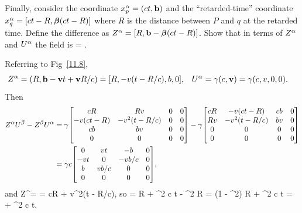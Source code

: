 \newcommand{\Za}{Z^\alp}
\newcommand{\Zsa}{Z_\alp}
\newcommand{\Zb}{Z^\bet}
\newcommand{\vbet}{\boldsymbol{\beta}}

\begin{problem}
	Finally, consider the coordinate $x^\alpha_p = (ct, \vb{b})$ and the ``retarded-time'' coordinate $\xaq = [ct - R, \vbet(ct - R)]$ where $R$ is the distance between $P$ and $q$ at the retarded time.  Define the difference as $\Za = [R, \vbb - \vbet(ct - R)]$.  Show that in terms of $\Za$ and $U^\alpha$ the field is
	\beqn \label{show2.c}
		\Fab =  \frac{\Za \Ub - \Zb \Ua}{(\Usa \Za / c)^3}.
	\eeqn
	\vfix
\end{problem}

\begin{solution}
	Referring to Fig~\ref{11.8},
	\begin{align*}
		\Za &= (R, \vbb - \vv t + \vv R / c) = [R, -v (t - R / c), b, 0], &
		\Ua &= \gam (c, \vv) = \gam (c, v, 0, 0).
	\end{align*}
	Then
	\begin{align*}
		\Za\Ub - \Zb \Ua &= \gam
			\mqty[c R & R v & 0 & 0 \\
				-v (c t - R) & -v^2 (t - R / c) & 0 & 0 \\
				c b & b v & 0 & 0 \\
				0 & 0 & 0 & 0 ]
			- \gam
			\mqty[ c R & -v (c t - R) & c b & 0 \\
				R v & -v^2 (t - R / c) & b v & 0 \\
				0 & 0 & 0 & 0 \\
				0 & 0 & 0 & 0 ] \\
		&= \gam c
			\mqty[0 & v t & -b & 0 \\
				-v t & 0 & -v b / c & 0 \\
				b & v b / c & 0 & 0 \\
				0 & 0 & 0 & 0 ],
	\end{align*}
	and
	\beq
		\Usa \Za = \gam \mqty[ c & -v & 0 & 0 ] \mqty[ R \\ -v (t - R / c) \\ b \\ 0 ]
		= \gam cR + \gam v^2(t - R/c),
	\eeq
	so
	\beq
		\frac{\Usa \Za}{c} = \gam R + \gam \bet^2 c t - \gam \bet^2 R
		= (1 - \bet^2) \gam R + \gam \bet^2 c t
		=  + \gam \bet^2 c t.
	\eeq
	

\end{solution}
